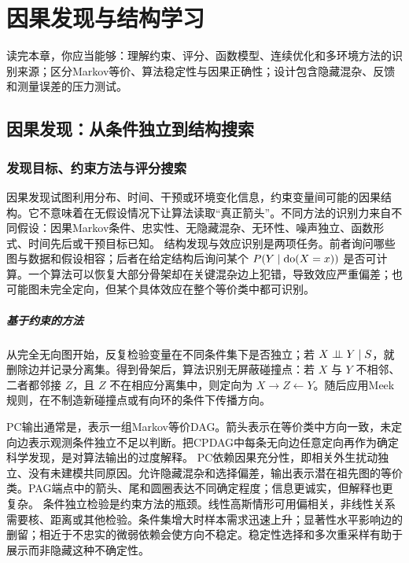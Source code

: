 \chapter{因果发现与结构学习}
\label{ch:discovery}

\begin{learninggoals}
读完本章，你应当能够：理解约束、评分、函数模型、连续优化和多环境方法的识别来源；区分Markov等价、算法稳定性与因果正确性；设计包含隐藏混杂、反馈和测量误差的压力测试。
\end{learninggoals}

\section{因果发现：从条件独立到结构搜索}

\subsection{发现目标、约束方法与评分搜索}

因果发现试图利用分布、时间、干预或环境变化信息，约束变量间可能的因果结构。它不意味着在无假设情况下让算法读取“真正箭头”。不同方法的识别力来自不同假设：因果Markov条件、忠实性、无隐藏混杂、无环性、噪声独立、函数形式、时间先后或干预目标已知。
结构发现与效应识别是两项任务。前者询问哪些图与数据和假设相容；后者在给定结构后询问某个 $P(Y\mid\operatorname{do}(X=x))$ 是否可计算。一个算法可以恢复大部分骨架却在关键混杂边上犯错，导致效应严重偏差；也可能图未完全定向，但某个具体效应在整个等价类中都可识别。

\paragraph{基于约束的方法}

从完全无向图开始，反复检验变量在不同条件集下是否独立；若 $X\mathrel{\perp\!\!\!\perp} Y\mid S$，就删除边并记录分离集。得到骨架后，算法识别无屏蔽碰撞点：若 $X$ 与 $Y$ 不相邻、二者都邻接 $Z$，且 $Z$ 不在相应分离集中，则定向为 $X\rightarrow Z\leftarrow Y$。随后应用Meek规则，在不制造新碰撞点或有向环的条件下传播方向\parencite{spirtes2000}。

PC输出通常是，表示一组Markov等价DAG。箭头表示在等价类中方向一致，未定向边表示观测条件独立不足以判断。把CPDAG中每条无向边任意定向再作为确定科学发现，是对算法输出的过度解释。
PC依赖因果充分性，即相关外生扰动独立、没有未建模共同原因。允许隐藏混杂和选择偏差，输出表示潜在祖先图的等价类。PAG端点中的箭头、尾和圆圈表达不同确定程度；信息更诚实，但解释也更复杂。
条件独立检验是约束方法的瓶颈。线性高斯情形可用偏相关，非线性关系需要核、距离或其他检验。条件集增大时样本需求迅速上升；显著性水平影响边的删留；相近于不忠实的微弱依赖会使方向不稳定。稳定性选择和多次重采样有助于展示而非隐藏这种不确定性。

